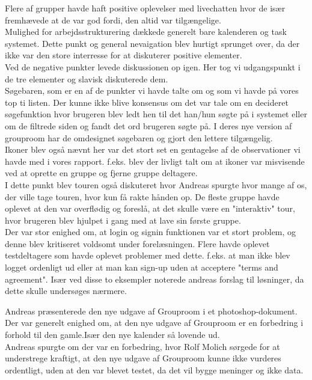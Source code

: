 \documentclass[12pt]{article}
\begin{document}
Flere af grupper havde haft positive oplevelser med livechatten hvor de især fremhævede at de var god fordi, den altid var tilgængelige. \\ Mulighed for arbejdsstrukturering dækkede generelt bare kalenderen og task systemet. Dette punkt og general nevaigation blev hurtigt sprunget over, da der ikke var den store interresse for at diskuterer positive elementer.\\

Ved de negative punkter levede diskussionen op igen. Her tog vi udgangspunkt i de tre elementer og slavisk diskuterede dem. \\
Søgebaren, som er en af de punkter vi havde talte om og som vi havde på vores top ti listen. Der kunne ikke blive konsensus om det var tale om en decideret søgefunktion hvor brugeren blev ledt hen til det han/hun søgte på i systemet eller om de filtrede siden og fandt det ord brugeren søgte på. I deres nye version af grouproom har de omdesignet søgebaren og gjort den lettere tilgængelig. \\

Ikoner blev også nævnt her var det stort set en gentagelse af de observationer vi havde med i vores rapport. f.eks. blev der livligt talt om at ikoner var misvisende ved at oprette en gruppe og fjerne gruppe deltagere.\\ I dette punkt blev touren også diskuteret hvor Andreas spurgte hvor mange af os, der ville tage touren, hvor kun få rakte hånden op. De fleste gruppe havde oplevet at den var overflødig og foreslå, at det skulle være en "interaktiv" tour, hvor brugeren blev hjulpet i gang med at lave sin første gruppe.\\

Der var stor enighed om, at login og signin funktionen var et stort problem, og denne blev kritiseret voldsomt under forelæsningen. Flere havde oplevet testdeltagere som havde oplevet problemer med dette. f.eks. at man ikke blev logget ordenligt ud eller at man kan sign-up uden at acceptere "terms and agreement". Især ved disse to eksempler noterede andreas forslag til løsninger, da dette skulle undersøges nærmere.

Andreas præsenterede den nye udgave af Grouproom i et photoshop-dokument. Der var generelt enighed om, at den nye udgave af Grouproom er en forbedring i forhold til den gamle.Især den nye kalender så lovende ud.\\
Andreas spurgte om der var en forbedring, hvor Rolf Molich sørgede for at understrege kraftigt, at den nye udgave af Grouproom kunne ikke vurderes ordentligt, uden at den var blevet testet, da det vil bygge meninger og ikke data.
\end{document}
